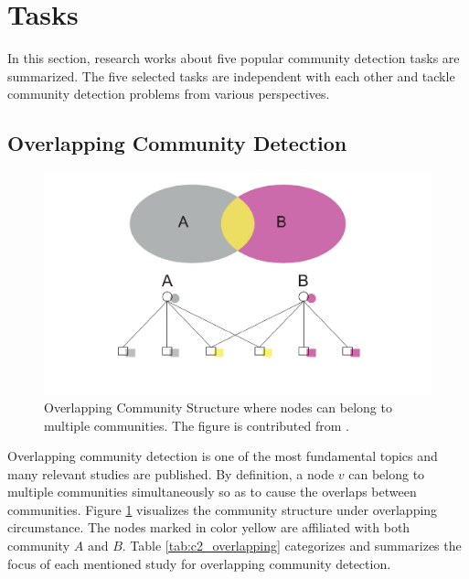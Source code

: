 \section{Tasks}
In this section, research works about five  popular community detection tasks are summarized. The five selected tasks are independent with each other and tackle community detection problems from various perspectives. 

\subsection{Overlapping Community Detection}
\begin{figure}
	\center
	\includegraphics[width=\columnwidth]{img/chapter2/overlapping.pdf} 
	\caption{Overlapping Community Structure where nodes can belong to multiple communities. The figure is contributed from \cite{yang2013overlapping}.}
	\label{fig:c2_overlapping}
\end{figure}  


Overlapping community detection is one of the most fundamental topics and many relevant studies are published. By definition, a node $v$ can belong to multiple communities simultaneously so as to cause the overlaps between communities. Figure \ref{fig:c2_overlapping} visualizes the community structure under overlapping circumstance. The nodes marked in color yellow are affiliated with both community $A$ and $B$. Table \ref{tab:c2_overlapping} categorizes and summarizes the focus of each mentioned study for overlapping community detection.

